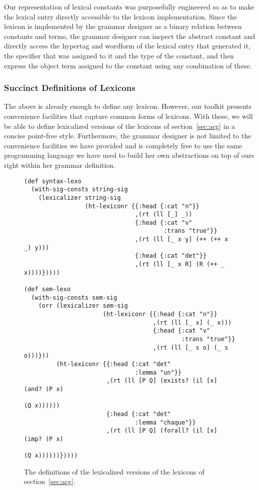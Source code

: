 Our representation of lexical constants was purposefully engineered so
as to make the lexical entry directly accessible to the lexicon
implementation. Since the lexicon is implemented by the grammar designer
as a binary relation between constants and terms, the grammar designer
can inspect the abstract constant and directly access the hypertag and
wordform of the lexical entry that generated it, the specifier that was
assigned to it and the type of the constant, and then express the object
term assigned to the constant using any combination of these.

\subsubsection{Succinct Definitions of Lexicons}

The above is already enough to define any lexicon. However, our toolkit
presents convenience facilities that capture common forms of
lexicons. With these, we will be able to define lexicalized versions of
the lexicons of section~\ref{sec:acg} in a concise point-free
style. Furthermore, the grammar designer is not limited to the
convenience facilities we have provided and is completely free to use
the same programming language we have used to build her own abstractions
on top of ours right within her grammar definition.

\begin{figure}
  \centering
\begin{verbatim}
(def syntax-lexo
  (with-sig-consts string-sig
    (lexicalizer string-sig
                 (ht-lexiconr {{:head {:cat "n"}}
                               ,(rt (ll [_] _))
                               {:head {:cat "v"
                                       :trans "true"}}
                               ,(rt (ll [_ x y] (++ (++ x _) y)))
                               {:head {:cat "det"}}
                               ,(rt (ll [_ x R] (R (++ _ x))))}))))

(def sem-lexo
  (with-sig-consts sem-sig
    (orr (lexicalizer sem-sig
                      (ht-lexiconr {{:head {:cat "n"}}
                                    ,(rt (ll [_ x] (_ x)))
                                    {:head {:cat "v"
                                            :trans "true"}}
                                    ,(rt (ll [_ s o] (_ s o)))}))
         (ht-lexiconr {{:head {:cat "det"
                               :lemma "un"}}
                       ,(rt (ll [P Q] (exists? (il [x] (and? (P x)
                                                             (Q x))))))
                       {:head {:cat "det"
                               :lemma "chaque"}}
                       ,(rt (ll [P Q] (forall? (il [x] (imp? (P x)
                                                             (Q x))))))}))))
\end{verbatim}
  \caption{\label{fig:lex-impl} The definitions of the lexicalized
    versions of the lexicons of section~\ref{sec:acg}.}
\end{figure}

